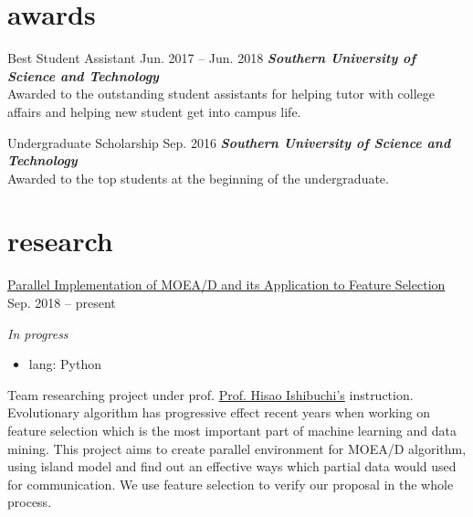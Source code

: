 \documentclass[hidelinks__VERSION__]{adamyi-cv}
\begin{document}
\section{awards}

\begin{entrylist}


\entry
{Best Student Assistant}
{Jun. 2017 -- Jun. 2018}
{\emph{\textbf{Southern University of Science and Technology}}\\
Awarded to the outstanding student assistants for helping tutor with college affairs and helping new student get into campus life.
}


\entry
{Undergraduate Scholarship}
{Sep. 2016}
{\emph{\textbf{Southern University of Science and Technology}}\\
Awarded to the top students at the beginning of the undergraduate.
}


\end{entrylist}


\section{research}

\begin{entrylist}


\entry
{\href{https://github.com/hackroid/pMOEA-D}{Parallel Implementation of MOEA/D and its Application to Feature Selection}}
{Sep. 2018 -- present}
{\emph{In progress}
\begin{itemize}
    \item lang: Python
\end{itemize}
Team researching project under prof. \href{http://cse.sustech.edu.cn/en/people/view/people_id/55/sort_id/9/pid/}{Prof. Hisao Ishibuchi's} instruction. Evolutionary algorithm has progressive effect recent years when working on feature selection which is the most important part of machine learning and data mining. This project aims to create parallel environment for MOEA/D algorithm, using island model and find out an effective ways which partial data would used for communication. We use feature selection to verify our proposal in the whole process.
}


\end{entrylist}
\end{document}
